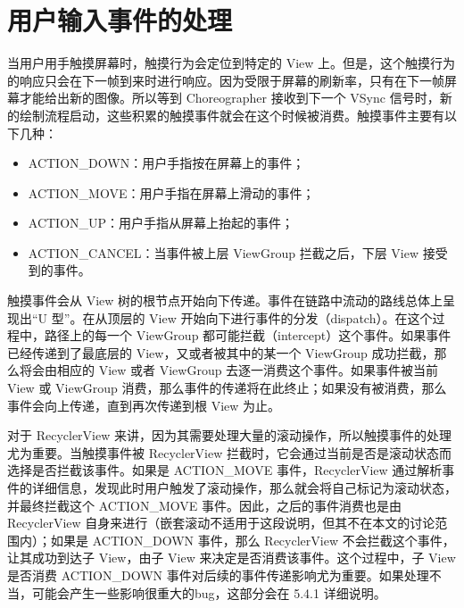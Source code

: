 \section{用户输入事件的处理}

当用户用手触摸屏幕时，触摸行为会定位到特定的 View 上。但是，这个触摸行为的响应只会在下一帧到来时进行响应。因为受限于屏幕的刷新率，只有在下一帧屏幕才能给出新的图像。所以等到 Choreographer 接收到下一个 VSync 信号时，新的绘制流程启动，这些积累的触摸事件就会在这个时候被消费。触摸事件主要有以下几种：

\begin{itemize}
    \item ACTION\_DOWN：用户手指按在屏幕上的事件；
    \item ACTION\_MOVE：用户手指在屏幕上滑动的事件；
    \item ACTION\_UP：用户手指从屏幕上抬起的事件；
    \item ACTION\_CANCEL：当事件被上层 ViewGroup 拦截之后，下层 View 接受到的事件。
\end{itemize}

触摸事件会从 View 树的根节点开始向下传递。事件在链路中流动的路线总体上呈现出“U 型”。在从顶层的 View 开始向下进行事件的分发（dispatch）。在这个过程中，路径上的每一个 ViewGroup 都可能拦截（intercept）这个事件。\cite{wu2017appcheck}如果事件已经传递到了最底层的 View，又或者被其中的某一个 ViewGroup 成功拦截，那么将会由相应的 View 或者 ViewGroup 去逐一消费这个事件。如果事件被当前 View 或 ViewGroup 消费，那么事件的传递将在此终止；如果没有被消费，那么事件会向上传递，直到再次传递到根 View 为止。

对于 RecyclerView 来讲，因为其需要处理大量的滚动操作，所以触摸事件的处理尤为重要。当触摸事件被 RecyclerView 拦截时，它会通过当前是否是滚动状态而选择是否拦截该事件。如果是 ACTION\_MOVE 事件，RecyclerView 通过解析事件的详细信息，发现此时用户触发了滚动操作，那么就会将自己标记为滚动状态，并最终拦截这个 ACTION\_MOVE 事件。因此，之后的事件消费也是由 RecyclerView 自身来进行（嵌套滚动不适用于这段说明，但其不在本文的讨论范围内）；如果是 ACTION\_DOWN 事件，那么 RecyclerView 不会拦截这个事件，让其成功到达子 View，由子 View 来决定是否消费该事件。这个过程中，子 View 是否消费 ACTION\_DOWN 事件对后续的事件传递影响尤为重要。如果处理不当，可能会产生一些影响很重大的bug，这部分会在 5.4.1 详细说明。